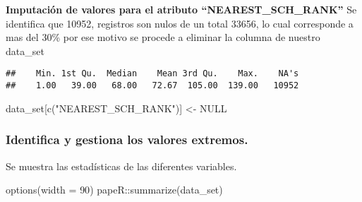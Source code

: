 \documentclass[
]{article}
\newenvironment{Shaded}{\begin{snugshade}}{\end{snugshade}}
\newcommand{\AttributeTok}[1]{\textcolor[rgb]{0.77,0.63,0.00}{#1}}
\newcommand{\ConstantTok}[1]{\textcolor[rgb]{0.00,0.00,0.00}{#1}}
\newcommand{\DecValTok}[1]{\textcolor[rgb]{0.00,0.00,0.81}{#1}}
\newcommand{\FunctionTok}[1]{\textcolor[rgb]{0.00,0.00,0.00}{#1}}
\newcommand{\NormalTok}[1]{#1}
\newcommand{\OtherTok}[1]{\textcolor[rgb]{0.56,0.35,0.01}{#1}}
\newcommand{\SpecialCharTok}[1]{\textcolor[rgb]{0.00,0.00,0.00}{#1}}
\newcommand{\StringTok}[1]{\textcolor[rgb]{0.31,0.60,0.02}{#1}}
\begin{document}
\begin{Shaded}
\end{Shaded}

\textbf{Imputación de valores para el atributo ``NEAREST\_SCH\_RANK''}
Se identifica que 10952, registros son nulos de un total 33656, lo cual
corresponde a mas del 30\% por ese motivo se procede a eliminar la
columna de nuestro data\_set

\begin{Shaded}
\end{Shaded}

\begin{verbatim}
##    Min. 1st Qu.  Median    Mean 3rd Qu.    Max.    NA's 
##    1.00   39.00   68.00   72.67  105.00  139.00   10952
\end{verbatim}

\begin{Shaded}
\begin{Highlighting}[]
\NormalTok{data\_set[}\FunctionTok{c}\NormalTok{(}\StringTok{"NEAREST\_SCH\_RANK"}\NormalTok{)] }\OtherTok{\textless{}{-}} \ConstantTok{NULL}
\end{Highlighting}
\end{Shaded}

\hypertarget{identifica-y-gestiona-los-valores-extremos.}{%
\subsubsection{Identifica y gestiona los valores
extremos.}\label{identifica-y-gestiona-los-valores-extremos.}}

Se muestra las estadísticas de las diferentes variables.

\begin{Shaded}
\begin{Highlighting}[]
\FunctionTok{options}\NormalTok{(}\AttributeTok{width =} \DecValTok{90}\NormalTok{)}
\NormalTok{papeR}\SpecialCharTok{::}\FunctionTok{summarize}\NormalTok{(data\_set)}
\end{Highlighting}
\end{Shaded}
\end{document}
